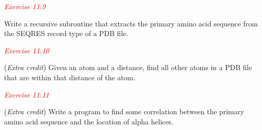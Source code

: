 \textcolor{red}{\textit{Exercise 11.9}}
\begin{adjustwidth}{1cm}{}
Write a recursive subroutine that extracts the primary amino acid sequence from the SEQRES record type of a PDB file. 
\end{adjustwidth}

\textcolor{red}{\textit{Exercise 11.10}}
\begin{adjustwidth}{1cm}{}
(\textit{Extra credit}) Given an atom and a distance, find all other atoms in a PDB file that are within that distance of the atom. 
\end{adjustwidth}

\textcolor{red}{\textit{Exercise 11.11}}
\begin{adjustwidth}{1cm}{}
(\textit{Extra credit}) Write a program to find some correlation between the primary amino acid sequence and the location of alpha helices. 
\end{adjustwidth}

